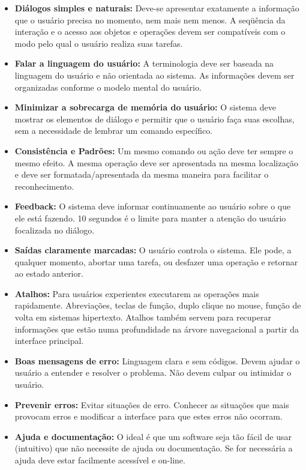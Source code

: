 \begin{description}
	\begin{itemize}
		\item{\textbf{Diálogos simples e naturais:} Deve-se apresentar exatamente a informação que o usuário precisa no momento, nem mais nem menos. A seqüência da interação e o acesso aos objetos e operações devem ser compatíveis com o modo pelo qual o usuário realiza suas tarefas.}
		\item{\textbf{Falar a linguagem do usuário:} A terminologia deve ser baseada na linguagem do usuário e não orientada ao sistema. As informações devem ser organizadas conforme o modelo mental do usuário.}
		\item{\textbf{Minimizar a sobrecarga de memória do usuário:} O sistema deve mostrar os elementos de diálogo e permitir que o usuário faça suas escolhas, sem a necessidade de lembrar um comando específico.}
		\item{\textbf{Consistência e Padrões:} Um mesmo comando ou ação deve ter sempre o mesmo efeito. A mesma operação deve ser apresentada na mesma localização e deve ser formatada/apresentada da mesma maneira para facilitar o reconhecimento.}
		\item{\textbf{Feedback:} O sistema deve informar continuamente ao usuário sobre o que ele está fazendo. 10 segundos é o limite para manter a atenção do usuário focalizada no diálogo.}
		\item{\textbf{Saídas claramente marcadas:} O usuário controla o sistema. Ele pode, a qualquer momento, abortar uma tarefa, ou desfazer uma operação e retornar ao estado anterior.}
		\item{\textbf{Atalhos:} Para usuários experientes executarem as operações mais rapidamente. Abreviações, teclas de função, duplo clique no mouse, função de volta em sistemas hipertexto. Atalhos também servem para recuperar informações que estão numa profundidade na árvore navegacional a partir da interface principal.}
		\item{\textbf{Boas mensagens de erro:} Linguagem clara e sem códigos. Devem ajudar o usuário a entender e resolver o problema. Não devem culpar ou intimidar o usuário.}
		\item{\textbf{Prevenir erros:} Evitar situações de erro. Conhecer as situações que mais provocam erros e modificar a interface para que estes erros não ocorram.}
		\item{\textbf{Ajuda e documentação:} O ideal é que um software seja tão fácil de usar (intuitivo) que não necessite de ajuda ou documentação. Se for necessária a ajuda deve estar facilmente acessível e on-line.}
	\end{itemize}



\end{description}
